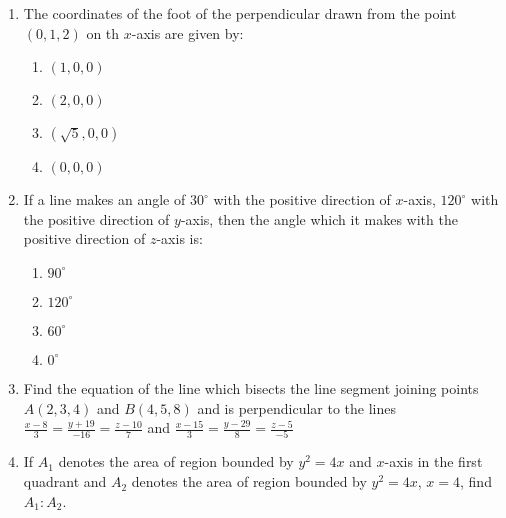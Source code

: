 \begin{enumerate}
	\item The coordinates of the foot of the perpendicular drawn from the point $(0,1,2)$ on th $x$-axis are given by:
		\begin{enumerate}
			\item $(1,0,0)$
			\item $(2,0,0)$
			\item $(\sqrt{5},0,0)$
			\item $(0,0,0)$
		\end{enumerate}
	\item If a line makes an angle of $30^{\circ}$ with the positive direction of $x$-axis, $120^{\circ}$ with the positive direction of $y$-axis, then the angle which it makes with the positive direction of $z$-axis is:
		\begin{enumerate}
			\item $90^{\circ}$
			\item $120^{\circ}$
			\item $60^{\circ}$
			\item $0^{\circ}$
		\end{enumerate}
	\item Find the equation of the line which bisects the line segment joining points $A(2,3,4)$ and $B(4,5,8)$ and is perpendicular to the lines $\frac{x-8}{3} = \frac{y+19}{-16} = \frac{z-10}{7}$ and $\frac{x-15}{3} = \frac{y-29}{8} = \frac{z-5}{-5}$
	\item If $A_{1}$ denotes the area of region bounded by $y^{2} = 4x$ and $x$-axis in the first quadrant and $A_{2}$ denotes the area of region bounded by $y^{2} = 4x$, $x=4$, find $A_{1} : A_{2}$.
\end{enumerate}
